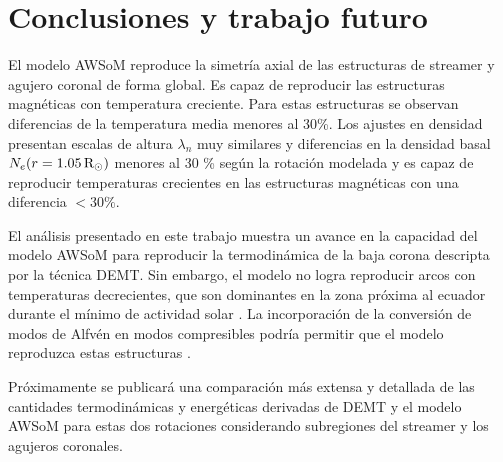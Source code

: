 \documentclass[baaa]{baaa}
\begin{document}

\section{Conclusiones y trabajo futuro}

El modelo AWSoM reproduce la simetría axial de las estructuras de streamer y agujero coronal de forma global. Es capaz de reproducir las estructuras magnéticas con temperatura creciente. Para estas estructuras se observan diferencias de la temperatura media menores al 30\%. Los ajustes en densidad presentan escalas de altura $\lambda_n$ muy similares y diferencias en la densidad basal $N_e(r=1.05\,{\rm R_\odot})$  menores al 30 \% según la rotación modelada y es capaz de reproducir temperaturas crecientes en las estructuras magnéticas con una diferencia $<30 \%$. 
 

El análisis presentado en este trabajo muestra un  avance en la capacidad del modelo AWSoM para reproducir la termodinámica de la baja corona descripta por la técnica DEMT. Sin embargo, el modelo no logra reproducir arcos con temperaturas decrecientes, que son dominantes en la zona próxima al ecuador durante el mínimo de actividad solar \citep{nuevo_2013}.  La incorporación de la conversión de modos de Alfvén en modos compresibles podría permitir que el modelo reproduzca estas estructuras \citep{schiff_2016}.

Próximamente se publicará una comparación más extensa y detallada de las cantidades termodinámicas y energéticas derivadas de DEMT y el modelo AWSoM para estas dos rotaciones considerando subregiones del streamer y los agujeros coronales.
\end{document}
